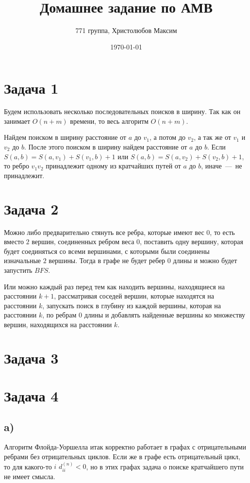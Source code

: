 \documentclass[a4paper,12pt]{article} %
\author{771 группа, Христолюбов Максим}
\title{Домашнее задание по АМВ}
\date{\today}
\begin{document}
	
	\maketitle
	
\section{Задача 1}
\hspace{5mm}
Будем использовать несколько последовательных поисков в ширину. Так как он занимает $O(n+m)$ времени, то весь алгоритм $O(n+m)$.

Найдем поиском в ширину расстояние от $a$ до $v_1$, а потом до $v_2$, а так же от $v_1$ и $v_2$ до $b$. После этого поиском в ширину найдем расстояние от $a$ до $b$. Если $S(a,b)=S(a,v_1)+S(v_1,b)+1$ или $S(a,b)=S(a,v_2)+S(v_2,b)+1$, то ребро $v_1v_2$ принадлежит одному из кратчайших путей от $a$ до $b$, иначе~---~не принадлежит.



\section{Задача 2}
\hspace{5mm}
Можно либо предварительно стянуть все ребра, которые имеют вес $0$, то есть вместо $2$ вершин, соединенных ребром веса $0$, поставить одну вершину, которая будет соединяться со всеми вершинами, с которыми были соединены изначальные $2$ вершины. Тогда в графе не будет ребер $0$ длины и можно будет запустить $BFS$.

Или можно каждый раз перед тем как находить вершины, находящиеся на расстоянии $k+1$, рассматривая соседей вершин, которые находятся на расстоянии $k$, запускать поиск в глубину из каждой вершины, которая на расстоянии $k$, по ребрам $0$ длины и добавлять найденные вершины ко множеству вершин, находящихся на расстоянии $k$.

\section{Задача 3}
\hspace{5mm}

\section{Задача 4}
\subsection{a)}
\hspace{5mm}
Алгоритм Флойда-Уоршелла итак корректно работает в графах с отрицательными ребрами без отрицательных циклов. Если же в графе есть отрицательный цикл, то для какого-то $i$ $d_{ii}^(n)<0$, но в этих графах задача о поиске кратчайшего пути не имеет смысла.
\end{document}

